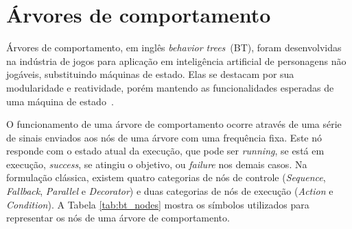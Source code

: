 \documentclass[repeatfields,xlists,xpacks,oneside,yearsonly]{ufrgscca}
\begin{document}
\section{Árvores de comportamento}

Árvores de comportamento, em inglês \textit{behavior trees}~(BT), foram desenvolvidas
na indústria de jogos para aplicação em inteligência artificial de personagens
não jogáveis, substituindo máquinas de estado.
Elas se destacam por sua modularidade e reatividade, porém mantendo as funcionalidades
esperadas de uma máquina de estado~\cite{BehaviorTree}.

O funcionamento de uma árvore de comportamento ocorre através de uma série de
sinais enviados aos nós de uma árvore com uma frequência fixa.
Este nó responde com o estado atual da execução, que pode ser \textit{running},
se está em execução, \textit{success}, se atingiu o objetivo, ou \textit{failure}
nos demais casos.
Na formulação clássica, existem quatro categorias de nós de controle (\textit{Sequence},
\textit{Fallback}, \textit{Parallel} e \textit{Decorator}) e duas categorias
de nós de execução (\textit{Action} e \textit{Condition}).
A Tabela \ref{tab:bt_nodes} mostra os símbolos utilizados para representar
os nós de uma árvore de comportamento.
\end{document}
